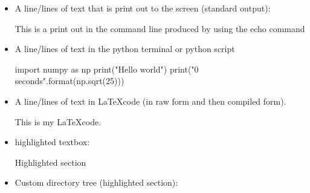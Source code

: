 \begin{itemize}
\item \begin{minipage}[t]{\textwidth} 
A line/lines of text that is print out to the screen (standard output):
\begin{latexbox}
\begin{cmdboxprint}
 This is a print out in the command line
 produced by using the echo command
\end{cmdboxprint}
\end{latexbox}
\end{minipage}


\item \begin{minipage}[t]{\textwidth} 
A line/lines of text in the python terminal or python script
\begin{latexbox}
\begin{pythonbox}
import numpy as np
print("Hello world")
print("{0} seconds".format(np.sqrt(25)))
\end{pythonbox}
\end{latexbox}
\end{minipage}


\item \begin{minipage}[t]{\textwidth} 
A line/lines of text in \LaTeX code (in raw form and then compiled form).
\begin{latexbox1}
\begin{latexbox}
This is my \LaTeX code.
\end{latexbox}
\end{latexbox1}
\end{minipage}

\item \begin{minipage}[t]{\textwidth} 
highlighted textbox:
\begin{latexbox}
\begin{thighlight}
Highlighted section
\end{thighlight}
\end{latexbox}
\end{minipage}


\item \begin{minipage}[t]{\textwidth} 
Custom directory tree (highlighted section):
\begin{latexbox}
\begin{tcustomdir}
\end{tcustomdir}
\end{latexbox}
\end{minipage}



\end{itemize}
